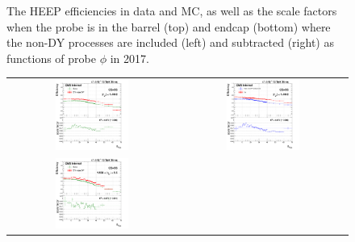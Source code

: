 \begin{figure}[htp]
\begin{center}
\begin{tabular}{cc}
    \end{tabular}
    \caption{The HEEP efficiencies in data and MC, as well as the scale factors when the probe is in the barrel (top) and endcap (bottom) where the non-DY processes are included (left) and subtracted (right) as functions of probe $\phi$ in 2017.}
    \label{fig:eff_SS_nominal_phi_2017}
  \end{center}
\end{figure}

\begin{figure}[bh]
  \begin{center}
    \begin{tabular}{cc}
      \includegraphics[width=0.45\textwidth]{figures/Zprime/2017/ScaleFactor/SameSign/nominal/g_compare_cut_nVtx_Barrel_ea_ta_inc_AS_nominal_PUW.png} &
      \includegraphics[width=0.45\textwidth]{figures/Zprime/2017/ScaleFactor/SameSign/nominal/g_compare_cut_nVtx_Barrel_ea_ta_exc_AS_nominal_PUW.png} \\
      \includegraphics[width=0.45\textwidth]{figures/Zprime/2017/ScaleFactor/SameSign/nominal/g_compare_cut_nVtx_Endcap_ea_ta_inc_AS_nominal_PUW.png} &

\end{tabular}
\end{center}
\end{figure}
